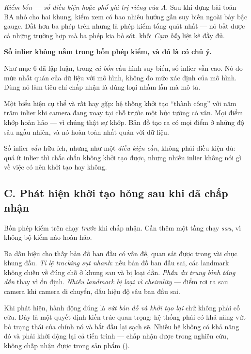 \documentclass[../../vslam.tex]{subfiles}
\begin{document}
\emph{Kiểm bốn --- số điều kiện hoặc phổ giá trị riêng của \(\Lambda\).} Sau khi dựng bài toán BA nhỏ cho hai khung, kiểm xem có bao nhiêu hướng gần suy biến ngoài bảy bậc gauge. Đắt hơn ba phép trên nhưng là phép kiểm tổng quát nhất --- nó bắt được cả những trường hợp mà ba phép kia bỏ sót.  khối \emph{Cạm bẫy} liệt kê đầy đủ.

\begin{cambay}
\textbf{Số inlier không nằm trong bốn phép kiểm, và đó là có chủ ý.}

Như  mục 6 đã lập luận, trong \emph{cả bốn} cấu hình suy biến, số inlier vẫn cao. Nó đo mức nhất quán của dữ liệu với mô hình, không đo mức xác định của mô hình. Dùng nó làm tiêu chí chấp nhận là đúng loại nhầm lẫn mà  mô tả.

Một biểu hiện cụ thể và rất hay gặp: hệ thống khởi tạo ``thành công'' với năm trăm inlier khi camera đang xoay tại chỗ trước một bức tường có vân. Mọi điểm khớp hoàn hảo --- vì chúng thật sự khớp. Bản đồ tạo ra có mọi điểm ở những độ sâu ngẫu nhiên, và nó hoàn toàn nhất quán với dữ liệu.

Số inlier \emph{vẫn} hữu ích, nhưng như một \emph{điều kiện cần}, không phải điều kiện đủ: quá ít inlier thì chắc chắn không khởi tạo được, nhưng nhiều inlier không nói gì về việc có nên khởi tạo hay không.
\end{cambay}

\subsection{C. Phát hiện khởi tạo hỏng sau khi đã chấp nhận}

Bốn phép kiểm trên chạy \emph{trước} khi chấp nhận. Cần thêm một tầng chạy \emph{sau}, vì không bộ kiểm nào hoàn hảo.

Ba dấu hiệu cho thấy bản đồ ban đầu có vấn đề, quan sát được trong vài chục khung đầu. \emph{Tỉ lệ tracking sụt nhanh}: nếu bản đồ ban đầu sai, các landmark không chiếu về đúng chỗ ở khung sau và bị loại dần. \emph{Phần dư trung bình tăng dần} thay vì ổn định. \emph{Nhiều landmark bị loại vì cheirality} --- điểm rơi ra sau camera khi camera di chuyển, dấu hiệu độ sâu ban đầu sai.

Khi phát hiện, hành động đúng là \emph{vứt bản đồ và khởi tạo lại} chứ không phải cố cứu. Đây là một quyết định kiến trúc quan trọng: hệ thống phải có khả năng vứt bỏ trạng thái của chính nó và bắt đầu lại sạch sẽ. Nhiều hệ không có khả năng đó và phải khởi động lại cả tiến trình --- chấp nhận được trong nghiên cứu, không chấp nhận được trong sản phẩm ().
\end{document}
